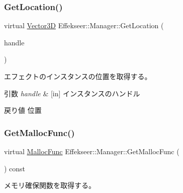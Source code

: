 \subsubsection{\texorpdfstring{Get\+Location()}{GetLocation()}}
{\footnotesize\ttfamily virtual \mbox{\hyperlink{struct_effekseer_1_1_vector3_d}{Vector3D}} Effekseer\+::\+Manager\+::\+Get\+Location (\begin{DoxyParamCaption}\item[{\mbox{\hyperlink{namespace_effekseer_afba58b8d812da862190e9bbfc040824a}{Handle}}}]{handle }\end{DoxyParamCaption})\hspace{0.3cm}{\ttfamily [pure virtual]}}



エフェクトのインスタンスの位置を取得する。 


\begin{DoxyParams}{引数}
{\em handle} & \mbox{[}in\mbox{]} インスタンスのハンドル \\
\hline
\end{DoxyParams}
\begin{DoxyReturn}{戻り値}
位置 
\end{DoxyReturn}
\mbox{\label{class_effekseer_1_1_manager_aacbf3bb08982ff3b7fd3c5685b88c286}} 
\subsubsection{\texorpdfstring{Get\+Malloc\+Func()}{GetMallocFunc()}}
{\footnotesize\ttfamily virtual \mbox{\hyperlink{namespace_effekseer_a2f9a04a7b2d08a8f2173ce47e57ff742}{Malloc\+Func}} Effekseer\+::\+Manager\+::\+Get\+Malloc\+Func (\begin{DoxyParamCaption}{ }\end{DoxyParamCaption}) const\hspace{0.3cm}{\ttfamily [pure virtual]}}



メモリ確保関数を取得する。 

\mbox{\label{class_effekseer_1_1_manager_aa5d7a667c75a81bc30f65483535b6a7f}} 
